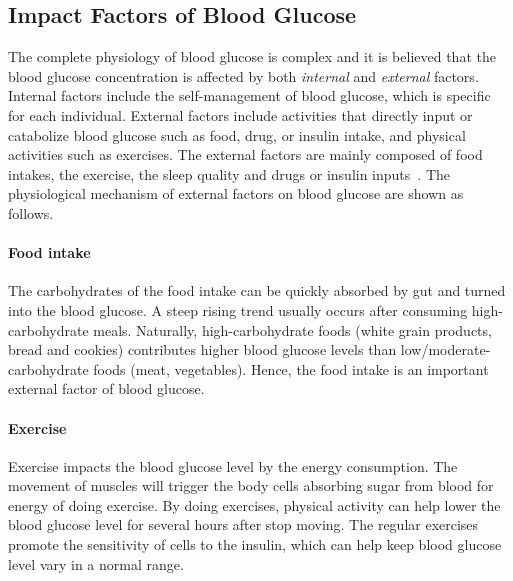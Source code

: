 \subsection{Impact Factors of Blood Glucose}
The complete physiology of blood glucose is complex and it is believed that the blood glucose concentration is affected by both \emph{internal} and \emph{external} factors.
Internal factors include the self-management of blood glucose, which is specific for each individual.
External factors include activities that directly input or catabolize blood glucose such as food, drug, or insulin intake, and physical activities such as exercises.
The external factors are mainly composed of food intakes, the exercise, the sleep quality and drugs or insulin inputs~\cite{bib:duke2010intelligent}. 
The physiological mechanism of external factors on blood glucose are shown as follows.

\paragraph{Food intake} 
The carbohydrates of the food intake can be quickly absorbed by gut and turned into the blood glucose. 
A steep rising trend usually occurs after consuming high-carbohydrate meals. 
Naturally, high-carbohydrate foods (\eg white grain products, bread and cookies) contributes higher blood glucose levels than low/moderate-carbohydrate foods (\eg meat, vegetables).
Hence, the food intake is an important external factor of blood glucose.

\paragraph{Exercise} 
Exercise impacts the blood glucose level by the energy consumption. 
The movement of muscles will trigger the body cells absorbing sugar from blood for energy of doing exercise.  
By doing exercises, physical activity can help lower the blood glucose level for several hours after stop moving. 
The regular exercises promote the sensitivity of cells to the insulin, which can help keep blood glucose level vary in a normal range.

